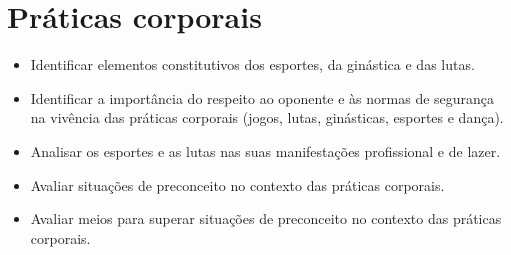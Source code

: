 \chapter{Práticas corporais}


\begin{itemize}
\item
  Identificar elementos constitutivos dos esportes, da ginástica e das
  lutas.
\item
  Identificar a importância do respeito ao oponente e às normas de
  segurança na vivência das práticas corporais (jogos, lutas,
  ginásticas, esportes e dança).
\item
  Analisar os esportes e as lutas nas suas manifestações profissional e
  de lazer.
\item
  Avaliar situações de preconceito no contexto das práticas corporais.
\item
  Avaliar meios para superar situações de preconceito no contexto das
  práticas corporais.
\end{itemize}


